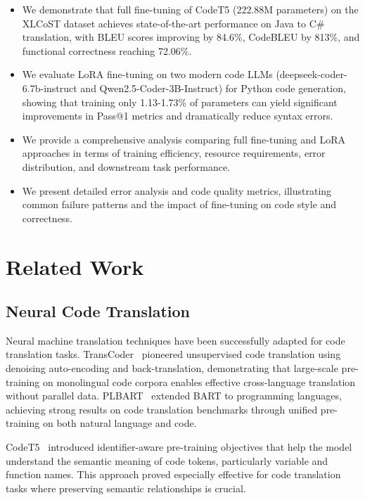 \documentclass[conference]{IEEEtran}
\begin{document}
\begin{itemize}
    \item We demonstrate that full fine-tuning of CodeT5 (222.88M parameters) on the XLCoST dataset achieves state-of-the-art performance on Java to C\# translation, with BLEU scores improving by 84.6\%, CodeBLEU by 813\%, and functional correctness reaching 72.06\%.
    
    \item We evaluate LoRA fine-tuning on two modern code LLMs (deepseek-coder-6.7b-instruct and Qwen2.5-Coder-3B-Instruct) for Python code generation, showing that training only 1.13-1.73\% of parameters can yield significant improvements in Pass@1 metrics and dramatically reduce syntax errors.
    
    \item We provide a comprehensive analysis comparing full fine-tuning and LoRA approaches in terms of training efficiency, resource requirements, error distribution, and downstream task performance.
    
    \item We present detailed error analysis and code quality metrics, illustrating common failure patterns and the impact of fine-tuning on code style and correctness.
\end{itemize}

\section{Related Work}

\subsection{Neural Code Translation}

Neural machine translation techniques have been successfully adapted for code translation tasks. TransCoder~\cite{roziere2020transcoder} pioneered unsupervised code translation using denoising auto-encoding and back-translation, demonstrating that large-scale pre-training on monolingual code corpora enables effective cross-language translation without parallel data. PLBART~\cite{ahmad2021plbart} extended BART to programming languages, achieving strong results on code translation benchmarks through unified pre-training on both natural language and code.

CodeT5~\cite{wang2021codet5} introduced identifier-aware pre-training objectives that help the model understand the semantic meaning of code tokens, particularly variable and function names. This approach proved especially effective for code translation tasks where preserving semantic relationships is crucial.
\end{document}
